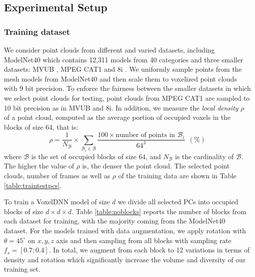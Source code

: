 \subsection{Experimental Setup}



\subsubsection{Training dataset} We consider point clouds from different and varied datasets, including ModelNet40 \cite{wu20153d} which contains 12,311 models from 40 categories and three smaller datasets: MVUB \cite{loop2016microsoft}, MPEG CAT1 \cite{noauthor_common_nodate} and 8i \cite{d20178i,8i}. We uniformly sample points from the mesh models from ModelNet40 and then scale them to voxelized point clouds with 9 bit precision. To enforce the fairness between the smaller datasets in which we select point clouds for testing, point clouds from MPEG CAT1 are sampled to 10 bit precision as in MVUB and 8i. In addition, we measure the \textit{local density} $\rho$ of a point cloud, computed as the average portion of occupied voxels in the blocks of size 64, that is: 
\begin{equation}
    \rho = \frac{1}{N_{\mathcal{B}}}\times\sum_{\mathcal{B}_i \in \mathcal{B}} \frac{100 \times \text{number of points in }\mathcal{B}_i}{64^3}\ \ (\%)
    \label{rhodensity}
\end{equation}
where $\mathcal{B}$ is the set of occupied blocks of size $64$, and $N_{\mathcal{B}}$ is the cardinality of $\mathcal{B}$. 
The higher the value of $\rho$ is, the denser the point cloud. The selected point clouds, number of frames as well as $\rho$ of the training data are shown in Table \ref{table:traintestpcs}. 
\par To train a VoxelDNN model of size $d$ we divide all selected PCs into occupied blocks of size $d\times d\times d$. Table \ref{table:noblocks} reports the number of blocks from each dataset for training, with the majority coming from the ModelNet40 dataset. For the models trained with data augmentation, we apply rotation with $\theta=45^\circ$ on $x,y,z$ axis and then sampling from all blocks with sampling rate $f_s=[0.7;0.4]$. In total, we augment from each block to 12 variations in terms of density and rotation which significantly increase the volume and diversity of our training set.




